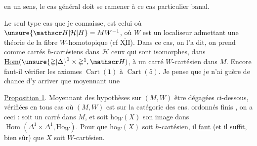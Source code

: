 en un sens, le cas général doit se ramener à ce cas particulier banal.

Le seul type  cas que je connaisse, est celui où $\unsure{\mathscr H|\mathcal H|H}=MW^{-1}$, où $W$ est un localiseur admettant une théorie de la fibre $W$-homotopique (cf $\underline{\overline{\mathrm{XII}}}$). Dans ce cas, on l'a dit, on prend comme carrés $h$-cartésiens dans $\mathscr H$ ceux qui sont isomorphes, dans $\underline{\operatorname{Hom}}(\unsure{\mathbb{\Delta}|\Delta}^{1}\times\mathbb{\Delta}^{1},\mathscr H)$, à un carré $W$-cartésien dans $M$. Encore faut-il vérifier les axiomes $\operatorname{Cart}(1)$ à $\operatorname{Cart}(5)$. Je pense que je n'ai guère de chance d'y arriver que moyennant une

\uline{Proposition 1}. Moyennant des hypothèses sur $(M,W)$  être dégagées ci-dessous, vérifiées en tous cas où $(M,W)$ est   sur la catégorie des ens. ordonnés finis , on a ceci :
\margin{$\vert$}
soit
un carré dans $M$, et soit $\mathrm{ho}_W(X)$ son image dans $\underline{\operatorname{Hom}}(\mathbb{\Delta}^{1}\times\mathbb{\Delta}^{1},\mathrm{Ho}_W)$.
\margin{$\vert$}
Pour que $\mathrm{ho}_W(X)$ soit $h$-cartésien, il \uline{faut} (et il suffit, bien sûr) que $X$ soit $W$-cartésien.
